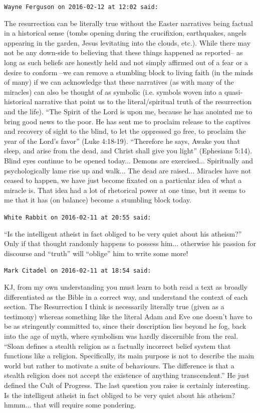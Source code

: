 \begin{footnotesize}
\begin{sffamily}
\texttt{Wayne Ferguson on 2016-02-12 at 12:02 said:}

The resurrection can be literally true without the Easter narratives being factual in a historical sense (tombs opening during the crucifixion, earthquakes, angels appearing in the garden, Jesus levitating into the clouds, etc.). While there may not be any down-side to believing that these things happened as reported-- as long as such beliefs are honestly held and not simply affirmed out of a fear or a desire to conform --we can remove a stumbling block to living faith (in the minds of many) if we can acknowledge that these narratives (as with many of the miracles) can also be thought of as symbolic (i.e. symbols woven into a quasi-historical narrative that point us to the literal/spiritual truth of the resurrection and the life). ``The Spirit of the Lord is upon me, because he has anointed me to bring good news to the poor. He has sent me to proclaim release to the captives and recovery of sight to the blind, to let the oppressed go free, to proclaim the year of the Lord's favor'' (Luke 4:18-19). ``Therefore he says, Awake you that sleep, and arise from the dead, and Christ shall give you light'' (Ephesians 5:14). Blind eyes continue to be opened today... Demons are exercised... Spiritually and psychologically lame rise up and walk... The dead are raised... Miracles have not ceased to happen, we have just become fixated on a particular idea of what a miracle is. That idea had a lot of rhetorical power at one time, but it seems to me that it has (on balance) become a stumbling block today.

\hfill

\texttt{White Rabbit on 2016-02-11 at 20:55 said:}

``Is the intelligent atheist in fact obliged to be very quiet about his atheism?'' Only if that thought randomly happens to possess him... otherwise his passion for discourse and ``truth'' will ``oblige'' him to write some more!

\hfill

\texttt{Mark Citadel on 2016-02-11 at 18:54 said:}

KJ, from my own understanding you must learn to both read a text as broadly differentiated as the Bible in a correct way, and understand the context of each section. The Resurrection I think is necessarily literally true (given as a testimony) whereas something like the literal Adam and Eve one doesn't have to be as stringently committed to, since their description lies beyond he fog, back into the age of myth, where symbolism was hardly discernible from the real. ``Sloan defines a stealth religion as a factually incorrect belief system that functions like a religion. Specifically, its main purpose is not to describe the main world but rather to motivate a suite of behaviours. The difference is that a stealth religion does not accept the existence of anything transcendent.'' He just defined the Cult of Progress. The last question you raise is certainly interesting. Is the intelligent atheist in fact obliged to be very quiet about his atheism? hmmm... that will require some pondering.


\end{sffamily}
\end{footnotesize}
